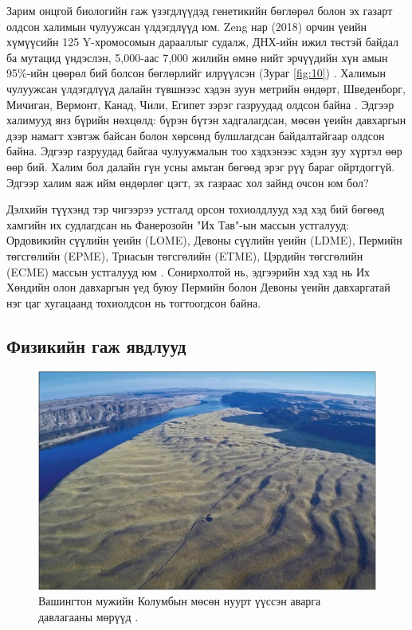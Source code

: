 \documentclass[10pt,twocolumn,letterpaper]{article}
\begin{document}
Зарим онцгой биологийн гаж үзэгдлүүдэд генетикийн бөглөрөл болон эх газарт олдсон халимын чулуужсан үлдэгдлүүд юм. Zeng нар (2018) орчин үеийн хүмүүсийн 125 Y-хромосомын дарааллыг судалж, ДНХ-ийн ижил төстэй байдал ба мутацид үндэслэн, 5,000-аас 7,000 жилийн өмнө нийт эрчүүдийн хүн амын 95\%-ийн цөөрөл бий болсон бөглөрлийг илрүүлсэн (Зураг \ref{fig:10}) \cite{62}. Халимын чулуужсан үлдэгдлүүд далайн түвшнээс хэдэн зуун метрийн өндөрт, Шведенборг, Мичиган, Вермонт, Канад, Чили, Египет зэрэг газруудад олдсон байна \cite{63,64,65,66}. Эдгээр халимууд янз бүрийн нөхцөлд: бүрэн бүтэн хадгалагдсан, мөсөн үеийн давхаргын дээр намагт хэвтэж байсан болон хөрсөнд булшлагдсан байдалтайгаар олдсон байна. Эдгээр газруудад байгаа чулуужмалын тоо хэдхэнээс хэдэн зуу хүртэл өөр өөр бий. Халим бол далайн гүн усны амьтан бөгөөд эрэг рүү бараг ойртдоггүй. Эдгээр халим яаж ийм өндөрлөг цэгт, эх газраас хол зайнд очсон юм бол?

Дэлхийн түүхэнд тэр чигээрээ устгалд орсон тохиолдлууд хэд хэд бий бөгөөд хамгийн их судлагдсан нь Фанерозойн "Их Тав"-ын массын устгалууд: Ордовикийн сүүлийн үеийн (LOME), Девоны сүүлийн үеийн (LDME), Пермийн төгсгөлийн (EPME), Триасын төгсгөлийн (ETME), Цэрдийн төгсгөлийн (ECME) массын устгалууд юм \cite{88,89}. Сонирхолтой нь, эдгээрийн хэд хэд нь Их Хөндийн олон давхаргын үед буюу Пермийн болон Девоны үеийн давхаргатай нэг цаг хугацаанд тохиолдсон нь тогтоогдсон байна.

\subsection{Физикийн гаж явдлууд}

\begin{figure}[b]
\begin{center}
   \includegraphics[width=1\linewidth]{columbia.jpg}
\end{center}

\caption{Вашингтон мужийн Колумбын мөсөн нуурт үүссэн аварга давлагааны мөрүүд \cite{80}.}
\label{fig:11}
\label{fig:onecol}
\end{figure}
\end{document}
